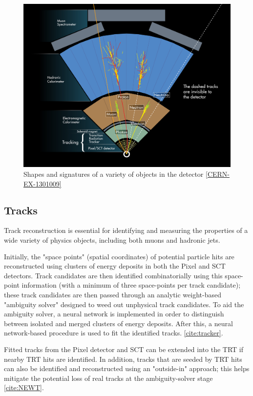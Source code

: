 \begin{figure}
  \includegraphics[width=\linewidth]{figures/methods_chapter/Sigs.jpg}
  \caption{Shapes and signatures of a variety of objects in the detector \ref{CERN-EX-1301009}}
  \label{fig:Signatures}
\end{figure}

\subsection{Tracks} \label{sec:Tracks} 

Track reconstruction is essential for identifying and measuring the properties of a wide variety of physics objects, including both muons and hadronic jets.

Initially, the "space points" (spatial coordinates) of potential particle hits are reconstructed using clusters of energy deposits in both the Pixel and SCT detectors. Track candidates are then identified combinatorially using this space-point information (with a minimum of three space-points per track candidate); these track candidates are then passed through an analytic weight-based "ambiguity solver" designed to weed out unphysical track candidates. To aid the ambiguity solver, a neural network is implemented in order to distinguish between isolated and merged clusters of energy deposits. After this, a neural network-based procedure is used to fit the identified tracks. \ref{cite:tracker}.

Fitted tracks from the Pixel detector and SCT can be extended into the TRT if nearby TRT hits are identified. In addition, tracks that are seeded by TRT hits can also be identified and reconstructed using an "outside-in" approach; this helps mitigate the potential loss of real tracks at the ambiguity-solver stage \ref{cite:NEWT}.

